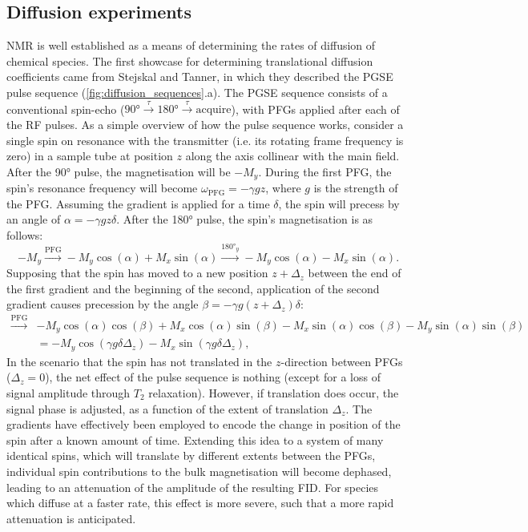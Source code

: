 \subsection{Diffusion experiments}
\label{subsec:diffusion_experiments}
\ac{NMR} is well established as a means of determining the rates of diffusion of chemical species\cite{Johnson1999,Morris2009b}.
The first showcase for determining translational diffusion coefficients came
from Stejskal and Tanner, in which they described the \ac{PGSE} pulse
sequence\cite{Stejskal1965} (\cref{fig:diffusion_sequences}.a).
The \ac{PGSE} sequence consists of a conventional spin-echo ($\ang{90}
\xrightarrow{\tau} \ang{180} \xrightarrow{\tau} \text{acquire}$), with
\acp{PFG} applied after each of the \ac{RF} pulses.
As a simple overview of how the pulse sequence works, consider a single spin on
resonance with the transmitter (i.e. its rotating frame frequency is zero) in a
sample tube at position $z$ along the axis collinear with the main field.
After the \ang{90} pulse, the magnetisation will be $-M_y$.
During the first \ac{PFG}, the spin's resonance frequency will become
$\omega_{\text{PFG}} = -\gamma g z$, where $g$ is the strength of the \ac{PFG}.
Assuming the gradient is applied for a time $\delta$, the spin will
precess by an angle of  $\alpha = -\gamma g z \delta$. After the \ang{180}
pulse, the spin's magnetisation is as follows:
\[
    -M_y
    \xrightarrow{\text{PFG}} -M_y \cos(\alpha) + M_x \sin(\alpha)
    \xrightarrow{\ang{180}_y} -M_y \cos(\alpha) - M_x \sin(\alpha).
\]
Supposing that the spin has moved to a new position $z + \Delta_z$
between the end of the first gradient and the beginning of the second,
application of the second gradient causes precession by the angle
$\beta = -\gamma g (z + \Delta_z) \delta$:
\begin{equation*}
   \begin{split}
        \xrightarrow{\text{PFG}}
            &-M_y \cos(\alpha)\cos(\beta) +
            M_x \cos(\alpha)\sin(\beta) -
            M_x \sin(\alpha)\cos(\beta) -
            M_y \sin(\alpha)\sin(\beta)\\
        &= -M_y \cos(\gamma g \delta \Delta_z) -
           M_x \sin(\gamma g \delta \Delta_z),
   \end{split}
\end{equation*}
In the scenario that the spin has not translated in the $z$-direction between
\acp{PFG} ($\Delta_z = 0$), the net effect of the pulse sequence is nothing
(except for a loss of signal amplitude through $T_2$ relaxation). However, if
translation does occur, the signal phase is adjusted, as a function of the
extent of translation $\Delta_z$. The gradients have effectively been employed
to encode the change in position of the spin after a known amount of time.
Extending this idea to a system of many identical spins, which will translate
by different extents between the \acp{PFG}, individual spin contributions to
the bulk magnetisation will become dephased, leading to an attenuation of the
amplitude of the resulting \ac{FID}. For species which diffuse at a faster
rate, this effect is more severe, such that a more rapid attenuation is
anticipated.

